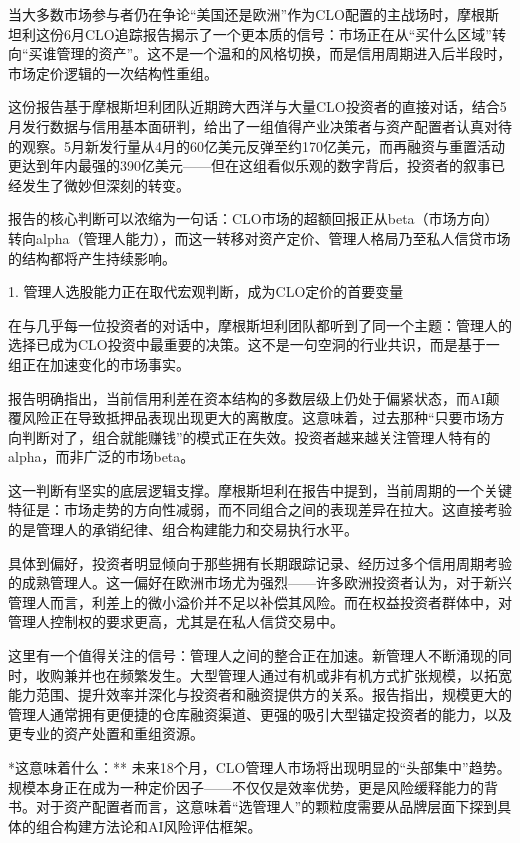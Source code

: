 \documentclass[11pt]{ctexart}
\begin{document}
当大多数市场参与者仍在争论“美国还是欧洲”作为CLO配置的主战场时，摩根斯坦利这份6月CLO追踪报告揭示了一个更本质的信号：市场正在从“买什么区域”转向“买谁管理的资产”。这不是一个温和的风格切换，而是信用周期进入后半段时，市场定价逻辑的一次结构性重组。

这份报告基于摩根斯坦利团队近期跨大西洋与大量CLO投资者的直接对话，结合5月发行数据与信用基本面研判，给出了一组值得产业决策者与资产配置者认真对待的观察。5月新发行量从4月的60亿美元反弹至约170亿美元，而再融资与重置活动更达到年内最强的390亿美元——但在这组看似乐观的数字背后，投资者的叙事已经发生了微妙但深刻的转变。

报告的核心判断可以浓缩为一句话：CLO市场的超额回报正从beta（市场方向）转向alpha（管理人能力），而这一转移对资产定价、管理人格局乃至私人信贷市场的结构都将产生持续影响。

1. 管理人选股能力正在取代宏观判断，成为CLO定价的首要变量

在与几乎每一位投资者的对话中，摩根斯坦利团队都听到了同一个主题：管理人的选择已成为CLO投资中最重要的决策。这不是一句空洞的行业共识，而是基于一组正在加速变化的市场事实。

报告明确指出，当前信用利差在资本结构的多数层级上仍处于偏紧状态，而AI颠覆风险正在导致抵押品表现出现更大的离散度。这意味着，过去那种“只要市场方向判断对了，组合就能赚钱”的模式正在失效。投资者越来越关注管理人特有的alpha，而非广泛的市场beta。

这一判断有坚实的底层逻辑支撑。摩根斯坦利在报告中提到，当前周期的一个关键特征是：市场走势的方向性减弱，而不同组合之间的表现差异在拉大。这直接考验的是管理人的承销纪律、组合构建能力和交易执行水平。

具体到偏好，投资者明显倾向于那些拥有长期跟踪记录、经历过多个信用周期考验的成熟管理人。这一偏好在欧洲市场尤为强烈——许多欧洲投资者认为，对于新兴管理人而言，利差上的微小溢价并不足以补偿其风险。而在权益投资者群体中，对管理人控制权的要求更高，尤其是在私人信贷交易中。

这里有一个值得关注的信号：管理人之间的整合正在加速。新管理人不断涌现的同时，收购兼并也在频繁发生。大型管理人通过有机或非有机方式扩张规模，以拓宽能力范围、提升效率并深化与投资者和融资提供方的关系。报告指出，规模更大的管理人通常拥有更便捷的仓库融资渠道、更强的吸引大型锚定投资者的能力，以及更专业的资产处置和重组资源。

*这意味着什么：** 未来18个月，CLO管理人市场将出现明显的“头部集中”趋势。规模本身正在成为一种定价因子——不仅仅是效率优势，更是风险缓释能力的背书。对于资产配置者而言，这意味着“选管理人”的颗粒度需要从品牌层面下探到具体的组合构建方法论和AI风险评估框架。
\end{document}
